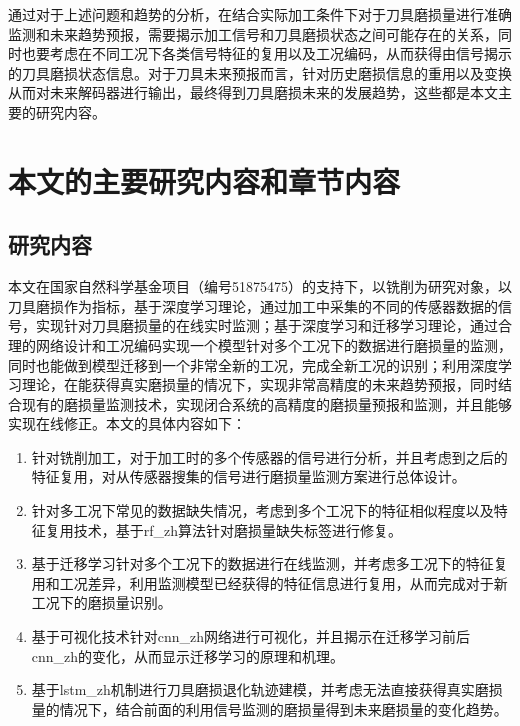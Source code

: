 通过对于上述问题和趋势的分析，在结合实际加工条件下对于刀具磨损量进行准确监测和未来趋势预报，需要揭示加工信号和刀具磨损状态之间可能存在的关系，同时也要考虑在不同工况下各类信号特征的复用以及工况编码，从而获得由信号揭示的刀具磨损状态信息。对于刀具未来预报而言，针对历史磨损信息的重用以及变换从而对未来解码器进行输出，最终得到刀具磨损未来的发展趋势，这些都是本文主要的研究内容。

\section{本文的主要研究内容和章节内容}

\subsection{研究内容}

本文在国家自然科学基金项目（编号51875475）的支持下，以铣削为研究对象，以刀具磨损作为指标，基于深度学习理论，通过加工中采集的不同的传感器数据的信号，实现针对刀具磨损量的在线实时监测；基于深度学习和迁移学习理论，通过合理的网络设计和工况编码实现一个模型针对多个工况下的数据进行磨损量的监测，同时也能做到模型迁移到一个非常全新的工况，完成全新工况的识别；利用深度学习理论，在能获得真实磨损量的情况下，实现非常高精度的未来趋势预报，同时结合现有的磨损量监测技术，实现闭合系统的高精度的磨损量预报和监测，并且能够实现在线修正。本文的具体内容如下：

\begin{enumerate}
	\item 针对铣削加工，对于加工时的多个传感器的信号进行分析，并且考虑到之后的特征复用，对从传感器搜集的信号进行磨损量监测方案进行总体设计。
	
	\item 针对多工况下常见的数据缺失情况，考虑到多个工况下的特征相似程度以及特征复用技术，基于\gls{rf_zh}算法针对磨损量缺失标签进行修复。
	
	\item 基于迁移学习针对多个工况下的数据进行在线监测，并考虑多工况下的特征复用和工况差异，利用监测模型已经获得的特征信息进行复用，从而完成对于新工况下的磨损量识别。
	
	\item 基于可视化技术针对\gls{cnn_zh}网络进行可视化，并且揭示在迁移学习前后\gls{cnn_zh}的变化，从而显示迁移学习的原理和机理。
	
	\item 基于\gls{lstm_zh}机制进行刀具磨损退化轨迹建模，并考虑无法直接获得真实磨损量的情况下，结合前面的利用信号监测的磨损量得到未来磨损量的变化趋势。
\end{enumerate}

